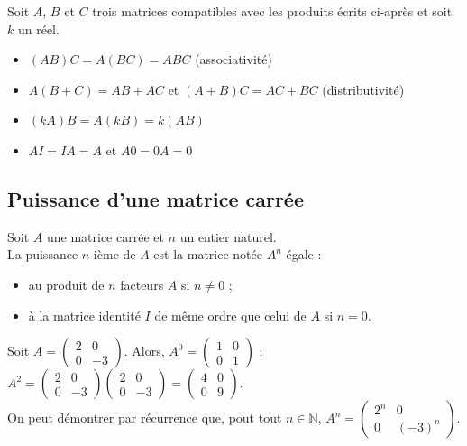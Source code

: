 \documentclass{cornouaille}
\begin{document}
\begin{proprietes}
Soit $A$, $B$ et $C$ trois matrices compatibles avec les produits écrits ci-après et soit $k$ un réel.
\begin{itemize}
\item $(AB)C = A(BC) = ABC$ (associativité)
\item $A(B+C)=AB+AC$ et $(A+B)C=AC+BC$ (distributivité)
\item $(kA)B=A(kB)=k(AB)$
\item $AI=IA=A$ et $A0=0A=0$
\end{itemize}
\end{proprietes}

\subsection{Puissance d'une matrice carrée}

\begin{definition}
Soit $A$ une matrice carrée et $n$ un entier naturel.\\
La puissance $n$-ième de $A$ est la matrice notée $A^n$ égale :
\begin{itemize}
\item au produit de $n$ facteurs $A$ si $n\neq0$ ;
\item à la matrice identité $I$ de même ordre que celui de $A$ si $n=0$.
\end{itemize}
\end{definition}

\begin{exemple}
Soit $A=\begin{pmatrix}
 2 & 0 \\
0 & -3
\end{pmatrix}$.
Alors, $A^0=\begin{pmatrix}
 1 & 0 \\
0 & 1
\end{pmatrix}$ ; $A^2=\begin{pmatrix} 2 & 0 \\ 0 & -3 \end{pmatrix}\begin{pmatrix}  2 & 0 \\ 0 & -3 \end{pmatrix}=\begin{pmatrix}
 4 & 0 \\
 0 & 9
\end{pmatrix}$.\\
On peut démontrer par récurrence que, pout tout $n\in\mathbb{N}$,  $A^n=\begin{pmatrix}
 2^n & 0 \\
0 & (-3)^n
\end{pmatrix}$.\\
\end{exemple}
\end{document}

